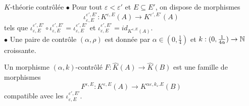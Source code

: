 \begin{frame}{$K$-théorie contrôlée}
$\bullet$ Pour tout $\varepsilon <\varepsilon'$ et $E\subseteq E'$, on dispose de morphismes 
\[\iota_{\varepsilon,E}^{\varepsilon',E'} : K^{\varepsilon,E}(A)\rightarrow K^{\varepsilon',E'}(A) \]
tels que $\iota_{\varepsilon,E}^{\varepsilon',E'}\circ \iota_{\varepsilon,E}^{\varepsilon',E'} = \iota_{\varepsilon,E}^{\varepsilon',E'}$ et $\iota_{\varepsilon,E}^{\varepsilon',E'}= id_{K^{\varepsilon,E}(A)}$.\\
\vspace{0.3 cm}
$\bullet$ Une paire de contrôle $(\alpha,\rho)$ est donnée par $\alpha\in (0,\frac{1}{4})$ et $k : (0,\frac{1}{4\alpha})\rightarrow \mathbb N $ croissante.
\begin{definitionfr}
Un morphisme $(\alpha,k)$-contrôlé $F : \hat K(A) \rightarrow \hat K(B)$ est une famille de morphismes 
\[F^{\varepsilon,E}: K^{\varepsilon,E}(A) \rightarrow K^{\alpha\varepsilon,k_\varepsilon. E}(B)\] 
compatible avec les $\iota_{\varepsilon,E}^{\varepsilon',E'}$.
\end{definitionfr}
\end{frame}












































